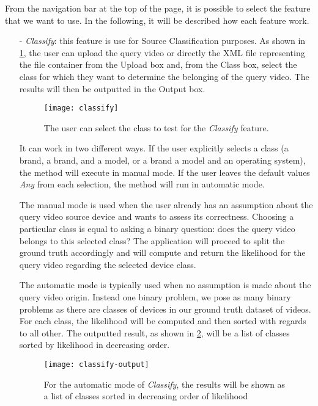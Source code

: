 From the navigation bar at the top of the page, it is possible to select the feature that we want to use. In the following, it will be described how each feature work.

\begin{itemize}

\item[-] \emph{Classify}: this feature is use for Source Classification purposes. As shown in \ref{fig:classify}, the user can upload the query video or directly the XML file representing the file container from the Upload box and, from the Class box, select the class for which they want to determine the belonging of the query video. The results will then be outputted in the Output box. 

\begin{figure}
  \centering
  \texttt{[image: classify]}
  \caption{The user can select the class to test for the \emph{Classify} feature.}\label{fig:classify}
\end{figure}

It can work in two different ways. If the user explicitly selects a class (a brand, a brand, and a model, or a brand a model and an operating system), the method will execute in manual mode. If the user leaves the default values \emph{Any} from each selection, the method will run in automatic mode.

The manual mode is used when the user already has an assumption about the query video source device and wants to assess its correctness. Choosing a particular class is equal to asking a binary question: does the query video belongs to this selected class? The application will proceed to split the ground truth accordingly and will compute and return the likelihood for the query video regarding the selected device class.

The automatic mode is typically used when no assumption is made about the query video origin. Instead one binary problem, we pose as many binary problems as there are classes of devices in our ground truth dataset of videos. For each class, the likelihood will be computed and then sorted with regards to all other. The outputted result, as shown in \ref{fig:classify-output}, will be a list of classes sorted by likelihood in decreasing order.

\begin{figure}
  \centering
  \texttt{[image: classify-output]}
  \caption{For the automatic mode of \emph{Classify}, the results will be shown as a list of classes sorted in decreasing order of likelihood}\label{fig:classify-output}
\end{figure}


\end{itemize}
